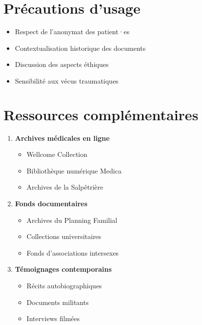 \documentclass[
  letterpaper,
  DIV=11,
  numbers=noendperiod]{scrreprt}
\providecommand{\tightlist}{%
  \setlength{\itemsep}{0pt}\setlength{\parskip}{0pt}}\usepackage{longtable,booktabs,array}
\begin{document}
\section{Précautions d'usage}\label{pruxe9cautions-dusage}

\begin{itemize}
\tightlist
\item
  Respect de l'anonymat des patient·es
\item
  Contextualisation historique des documents
\item
  Discussion des aspects éthiques
\item
  Sensibilité aux vécus traumatiques
\end{itemize}

\section{Ressources
complémentaires}\label{ressources-compluxe9mentaires}

\begin{enumerate}
\def\labelenumi{\arabic{enumi}.}
\tightlist
\item
  \textbf{Archives médicales en ligne}

  \begin{itemize}
  \tightlist
  \item
    Wellcome Collection
  \item
    Bibliothèque numérique Medica
  \item
    Archives de la Salpêtrière
  \end{itemize}
\item
  \textbf{Fonds documentaires}

  \begin{itemize}
  \tightlist
  \item
    Archives du Planning Familial
  \item
    Collections universitaires
  \item
    Fonds d'associations intersexes
  \end{itemize}
\item
  \textbf{Témoignages contemporains}

  \begin{itemize}
  \tightlist
  \item
    Récits autobiographiques
  \item
    Documents militants
  \item
    Interviews filmées
  \end{itemize}
\end{enumerate}
\end{document}
